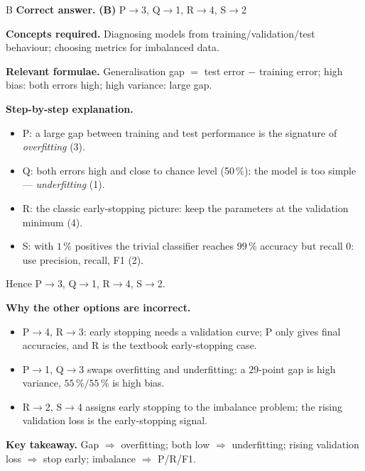 \documentclass[11pt,a4paper]{article}
\newcommand{\qsep}{\par\vspace{2pt}{\color{black!15}\hrule}\vspace{4pt}}
\begin{document}
\begin{solbox}{B}
\textbf{\color{brand}Correct answer.} \textcolor{okgreen}{\textbf{(B)}} P$\to$3, Q$\to$1, R$\to$4, S$\to$2

\textbf{\color{brand}Concepts required.} Diagnosing models from training/validation/test behaviour; choosing metrics for imbalanced data.

\textbf{\color{brand}Relevant formulae.} Generalisation gap $= $ test error $-$ training error; high bias: both errors high; high variance: large gap.

\textbf{\color{brand}Step-by-step explanation.} \begin{itemize}\itemsep0pt
\item P: a large gap between training and test performance is the signature of \emph{overfitting} (3).
\item Q: both errors high and close to chance level (50\,\%): the model is too simple --- \emph{underfitting} (1).
\item R: the classic early-stopping picture: keep the parameters at the validation minimum (4).
\item S: with $1\,\%$ positives the trivial classifier reaches $99\,\%$ accuracy but recall 0: use precision, recall, F1 (2).
\end{itemize}
Hence P$\to$3, Q$\to$1, R$\to$4, S$\to$2.

\textbf{\color{brand}Why the other options are incorrect.}
\begin{itemize}[leftmargin=2.4em, itemsep=1pt, topsep=2pt]
\item[\textbf{(A)}] P$\to$4, R$\to$3: early stopping needs a validation curve; P only gives final accuracies, and R is the textbook early-stopping case.
\item[\textbf{(C)}] P$\to$1, Q$\to$3 swaps overfitting and underfitting: a $29$-point gap is high variance, $55\,\%/55\,\%$ is high bias.
\item[\textbf{(D)}] R$\to$2, S$\to$4 assigns early stopping to the imbalance problem; the rising validation loss is the early-stopping signal.
\end{itemize}
\textbf{\color{brand}Key takeaway.} Gap $\Rightarrow$ overfitting; both low $\Rightarrow$ underfitting; rising validation loss $\Rightarrow$ stop early; imbalance $\Rightarrow$ P/R/F1.
\end{solbox}
\qsep
\end{document}
